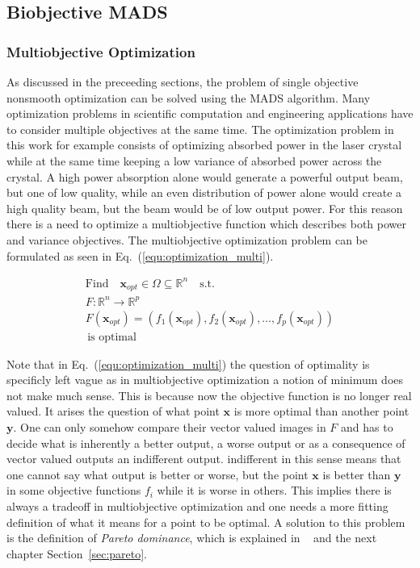 \documentclass[a4paper,10pt]{article}
\renewcommand{\vec}[1]{\mathbf{#1}}
\newcommand{\equref}[1]{Eq.~(\ref{#1})}
\newcommand{\secref}[1]{Section~\ref{#1}}
\begin{document}
    \subsection{Biobjective MADS}
    \subsubsection{Multiobjective Optimization}

    As discussed in the preceeding sections, the problem of single objective
    nonsmooth optimization can be solved using the MADS algorithm.
    Many optimization problems in scientific computation and engineering
    applications have to consider multiple objectives at the same time.
    The optimization problem in this work for example consists of
    optimizing absorbed power in the laser crystal while at the same
    time keeping a low variance of absorbed power across the crystal.
    A high power absorption alone would generate a powerful output
    beam, but one of low quality, while an even distribution of power
    alone would create a high quality beam, but the beam would be of low
    output power.
    For this reason there is a need to optimize a multiobjective function
    which describes both power and variance objectives.
    The multiobjective optimization problem can be formulated as seen
    in \equref{equ:optimization_multi}.

    \begin{equation}
        \label{equ:optimization_multi}
        \begin{gathered}
        \text{Find} \quad \vec{x}_{opt} \in \Omega \subseteq \mathbb{R}^n \quad \text{s.t.}\\
        F:\mathbb{R}^n \rightarrow \mathbb{R}^p \\ 
        F(\vec{x}_{opt}) = (f_1(\vec{x}_{opt}),f_2(\vec{x}_{opt}),\dots,f_p(\vec{x}_{opt}))\\
        \, \text{is optimal}
        \end{gathered}
    \end{equation}

    Note that in \equref{equ:optimization_multi} the question of optimality is
    specificly left vague as in multiobjective optimization a notion
    of minimum does not make much sense.
    This is because now the objective function is no longer real valued.
    It arises the question of what point $\vec{x}$ is more optimal than
    another point $\vec{y}$.
    One can only somehow compare their vector valued images in $F$ and
    has to decide what is inherently a better output, a worse output or
    as a consequence of vector valued outputs an indifferent output.
    indifferent in this sense means that one cannot say what output
    is better or worse, but the point $\vec{x}$ is better than $\vec{y}$
    in some objective functions $f_i$ while it is worse in others.
    This implies there is always a tradeoff in multiobjective optimization
    and one needs a more fitting definition of what it means
    for a point to be optimal.
    A solution to this problem is the definition of \emph{Pareto dominance},
    which is explained in ~\cite{multiobjective} and the next chapter 
    \secref{sec:pareto}.
\end{document}
